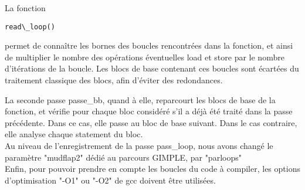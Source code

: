 La fonction \begin{verbatim}read\_loop()\end{verbatim} permet de connaître les bornes des boucles rencontrées dans la fonction, et ainsi de multiplier le nombre des opérations éventuelles load et store par le nombre d'itérations de la boucle. Les blocs de base contenant ces boucles sont écartées du traitement classique des blocs, afin d'éviter des redondances.

La seconde passe passe\_bb, quand à elle, reparcourt les blocs de base de la fonction, et vérifie pour chaque bloc considéré s'il a déjà été traité dans la passe précédente. Dans ce cas, elle passe au bloc de base suivant. Dans le cas contraire, elle analyse chaque statement du bloc.\\ 

Au niveau de l'enregistrement de la passe pass\_loop, nous avons changé le paramètre "mudflap2" dédié au parcours GIMPLE, par "parloops"\\
Enfin, pour pouvoir prendre en compte les boucles du code à compiler, les options d'optimisation "-O1" ou "-O2" de gcc doivent être utilisées.


